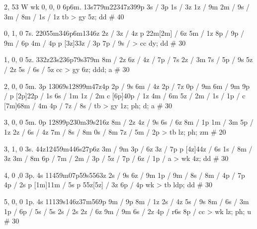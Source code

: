 % 
2, 53
W
wk
0, 0, 0
6p6m. 
13s779m22347z399p 
3s / 3p
1s / 3z
1z / 9m 
2m / 
9s / 
3m / 
8m / 
1s / 1z
tb > gy
5z; dd # 40

0, 1, 0
7s. 
22055m346p6m1346z
2z / 
3z / 4z 
p 22m[2m] / 6z 
5m / 1z 
8p / 
9p / 
9m / 6p 
4m / 4p 
p [3z]33z / 3p 
7p / 
9s / 
> cc
dy; dd # 30

1, 0, 0
5z.
332z23s236p79s379m
8m / 2z 
6z / 
4z / 
7p / 7s
2z / 3m 
7s / 
5p / 9s 
5z / 2z 
5s / 
6s / 5z 
cc > gy 
6z; ddd; a # 30

2, 0, 0
5m. 3p
13069s12899m47z4p
2p / 9s 
6m / 4z 
2p / 7z 
0p / 9m 
6m / 9m
9p / 
p [2p]22p / 1s 
6s / 1m 
1z / 2m 
c [6p]40p / 1z 
4m / 6m 
5z / 
2m / 
1s / 
1p / 
c [7m]68m / 4m 
4p / 
7z / 
8s / 
tb > gy 
1z; ph; d; a # 30

3, 0, 0
5m. 0p
12899p230m39s216z
8m / 2z 
4z / 9s 
6s / 6z 
8m / 1p 
1m / 3m 
5p / 1z 
2z / 
6s / 4z 
7m / 
8s / 8m 
0s / 8m 
7z / 
5m / 2p 
> tb 
lz; ph; zm # 20

3, 1, 0
3s. 
44z12459m446s27p6z
3m / 9m 
3p / 6z 
3z / 7p 
p [4z]44z / 6s 
1s / 
8m / 3z 
3m / 8m 
6p / 
7m /
2m / 
3p / 
5z / 
7p / 
6z / 
1p / a
> wk
4z; dd # 30 

4, 0 ,0
3p. 4s 
11459m07p59s5563z
2s / 9s 
6z / 9m 
1p / 
9m / 
8s / 
8m / 
4p / 7p 
4p / 2s 
p [1m]11m / 5s 
p 55z[5z] / 3z 
6p / 4p 
wk > tb 
ldp; dd # 30

5, 0, 0
1p. 4s
11139s146z37m569p
9m / 9p 
8m / 1z 
2s / 4z 
5s / 9s 
8m / 
6s / 3m 
1p /
6p / 
5s / 5s 
2s / 2s 
2z / 6z 
9m / 9m 
6s / 2z 
4p / r6s 
8p / 
cc > wk 
lz; ph; u # 30